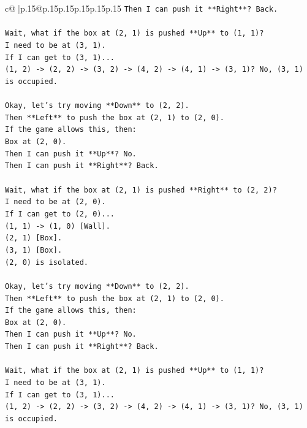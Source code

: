 \documentclass{article}
\begin{document}
{\begin{supertabular}{c@{$\;$}|p{.15\linewidth}@{}p{.15\linewidth}p{.15\linewidth}p{.15\linewidth}p{.15\linewidth}p{.15\linewidth}}
{{{\texttt{Then I can push it **Right**? Back.} \\
\\ 
\texttt{Wait, what if the box at (2, 1) is pushed **Up** to (1, 1)?} \\
\texttt{I need to be at (3, 1).} \\
\texttt{If I can get to (3, 1)...} \\
\texttt{(1, 2) {-}> (2, 2) {-}> (3, 2) {-}> (4, 2) {-}> (4, 1) {-}> (3, 1)? No, (3, 1) is occupied.} \\
\\ 
\texttt{Okay, let's try moving **Down** to (2, 2).} \\
\texttt{Then **Left** to push the box at (2, 1) to (2, 0).} \\
\texttt{If the game allows this, then:} \\
\texttt{Box at (2, 0).} \\
\texttt{Then I can push it **Up**? No.} \\
\texttt{Then I can push it **Right**? Back.} \\
\\ 
\texttt{Wait, what if the box at (2, 1) is pushed **Right** to (2, 2)?} \\
\texttt{I need to be at (2, 0).} \\
\texttt{If I can get to (2, 0)...} \\
\texttt{(1, 1) {-}> (1, 0) {[}Wall{]}.} \\
\texttt{(2, 1) {[}Box{]}.} \\
\texttt{(3, 1) {[}Box{]}.} \\
\texttt{(2, 0) is isolated.} \\
\\ 
\texttt{Okay, let's try moving **Down** to (2, 2).} \\
\texttt{Then **Left** to push the box at (2, 1) to (2, 0).} \\
\texttt{If the game allows this, then:} \\
\texttt{Box at (2, 0).} \\
\texttt{Then I can push it **Up**? No.} \\
\texttt{Then I can push it **Right**? Back.} \\
\\ 
\texttt{Wait, what if the box at (2, 1) is pushed **Up** to (1, 1)?} \\
\texttt{I need to be at (3, 1).} \\
\texttt{If I can get to (3, 1)...} \\
\texttt{(1, 2) {-}> (2, 2) {-}> (3, 2) {-}> (4, 2) {-}> (4, 1) {-}> (3, 1)? No, (3, 1) is occupied.} \\
}}}
\end{supertabular}}
\end{document}
